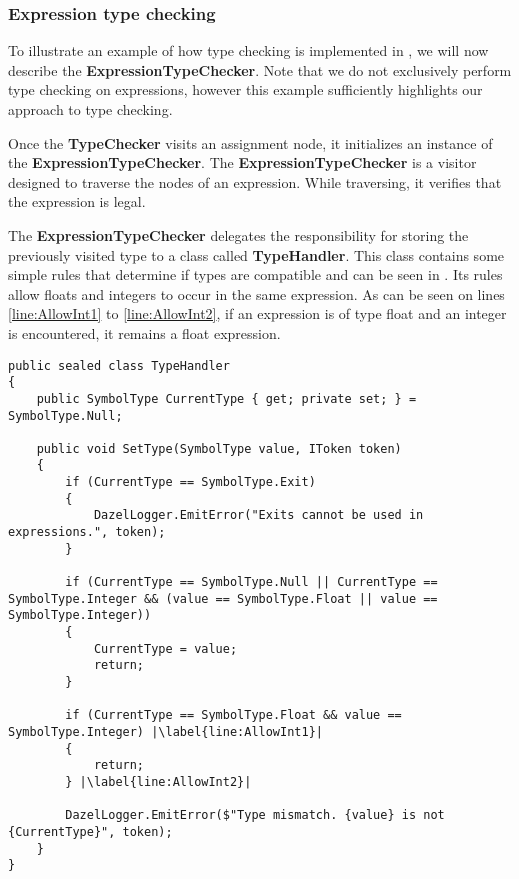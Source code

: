 \subsubsection*{Expression type checking} \label{sec:ExpressionTypeChecking}
To illustrate an example of how type checking is implemented in \dazel{}, we will now describe the \textbf{ExpressionTypeChecker}.
Note that we do not exclusively perform type checking on expressions, however this example sufficiently highlights our approach to type checking.


Once the \textbf{TypeChecker} visits an assignment node, it initializes an instance of the \textbf{ExpressionTypeChecker}. The \textbf{ExpressionTypeChecker} is a visitor designed to traverse the nodes of an expression. While traversing, it verifies that the expression is legal.

The \textbf{ExpressionTypeChecker} delegates the responsibility for storing the previously visited type to a class called \textbf{TypeHandler}. This class contains some simple rules that determine if types are compatible and can be seen in . 
Its rules allow floats and integers to occur in the same expression. As can be seen on lines \ref{line:AllowInt1} to \ref{line:AllowInt2}, if an expression is of type float and an integer is encountered, it remains a float expression.

\begin{lstlisting}[language=CSharp, caption={The \textbf{TypeHandler} class.}, label={lst:TypeHandler},escapechar=|]
public sealed class TypeHandler
{
    public SymbolType CurrentType { get; private set; } = SymbolType.Null;

    public void SetType(SymbolType value, IToken token)
    {
        if (CurrentType == SymbolType.Exit)
        {
            DazelLogger.EmitError("Exits cannot be used in expressions.", token);
        }
            
        if (CurrentType == SymbolType.Null || CurrentType == SymbolType.Integer && (value == SymbolType.Float || value == SymbolType.Integer))
        {
            CurrentType = value;
            return;
        }
            
        if (CurrentType == SymbolType.Float && value == SymbolType.Integer) |\label{line:AllowInt1}|
        {
            return;
        } |\label{line:AllowInt2}|
            
        DazelLogger.EmitError($"Type mismatch. {value} is not {CurrentType}", token);
    }
}
\end{lstlisting}


